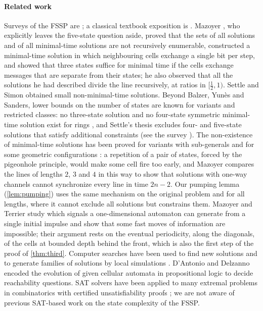 \paragraph{Related work}
Surveys of the FSSP are \cite{Mazoyer86,Umeo09}; a classical textbook
exposition is \cite{Minsky67}. Mazoyer \cite{Mazoyer96}, who explicitly
leaves the five-state question aside, proved that the sets of all solutions
and of all minimal-time solutions are not recursively enumerable,
constructed a minimal-time solution in which neighbouring cells exchange a
single bit per step, and showed that three states suffice for minimal time
if the cells exchange messages that are separate from their states; he also
observed that all the solutions he had described divide the line
recursively, at ratios in $[\frac12,1)$. Settle and Simon \cite{SettleSimon02}
obtained small non-minimal-time solutions. Beyond Balzer, Yun\`es and
Sanders, lower bounds on the number of states are known for variants and
restricted classes: no three-state solution and no four-state symmetric
minimal-time solution exist for rings \cite{BerthiaumeEtAl04}, and Settle's
thesis \cite{Settle99} excludes four- and five-state solutions that satisfy
additional constraints (see the survey \cite{Correa17}). The non-existence
of minimal-time solutions has been proved for variants with sub-generals
and for some geometric configurations \cite{YamashitaEtAl14,Kobayashi19}:
a repetition of a pair of states, forced by the pigeonhole principle, would
make some cell fire too early, and Mazoyer \cite[Prop.~2]{Mazoyer96}
compares the lines of lengths $2$, $3$ and $4$ in this way to show that
solutions with one-way channels cannot synchronize every line in time
$2n-2$. Our pumping lemma (\cref{lem:pumping}) uses the same mechanism on
the original problem and for all lengths, where it cannot exclude all
solutions but constrains them. Mazoyer and Terrier
\cite{MazoyerTerrier94,MazoyerTerrier99} study which signals a
one-dimensional automaton can generate from a single initial impulse and
show that some fast moves of information are impossible; their argument
rests on the eventual periodicity, along the diagonals, of the cells at
bounded depth behind the front, which is also the first step of the proof
of \cref{thm:third}. Computer searches have been used to find new solutions
\cite{Clergue18} and to generate families of solutions by local simulations
\cite{NguyenMaignan20}. D'Antonio and Delzanno \cite{DAntonioDelzanno04}
encoded the evolution of given cellular automata in propositional logic to
decide reachability questions. SAT solvers have been applied to many
extremal problems in combinatorics with certified unsatisfiability proofs
\cite{HeuleKullmannMarek16,Heule18}; we are not aware of previous SAT-based
work on the state complexity of the FSSP.

